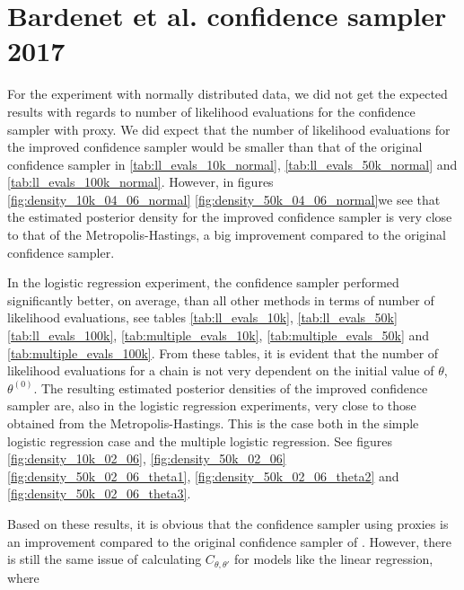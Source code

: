 \section{Bardenet et al. confidence sampler 2017}
For the experiment with normally distributed data, we did not get the expected results with regards to number of likelihood evaluations for the confidence sampler with proxy. We did expect that the number of likelihood evaluations for the improved confidence sampler would be smaller than that of the original confidence sampler in \ref{tab:ll_evals_10k_normal}, \ref{tab:ll_evals_50k_normal} and \ref{tab:ll_evals_100k_normal}. However, in figures \ref{fig:density_10k_04_06_normal} \ref{fig:density_50k_04_06_normal}we see that the estimated posterior density for the improved confidence sampler is very close to that of the Metropolis-Hastings, a big improvement compared to the original confidence sampler. 

In the logistic regression experiment, the confidence sampler performed significantly better, on average, than all other methods in terms of number of likelihood evaluations, see tables \ref{tab:ll_evals_10k}, \ref{tab:ll_evals_50k} \ref{tab:ll_evals_100k}, \ref{tab:multiple_evals_10k}, \ref{tab:multiple_evals_50k} and \ref{tab:multiple_evals_100k}. From these tables, it is evident that the number of likelihood evaluations for a chain is not very dependent on the initial value of $\theta$, $\theta^{\left(0\right)}$.  The resulting estimated posterior densities of the improved confidence sampler are, also in the logistic regression experiments, very close to those obtained from the Metropolis-Hastings. This is the case both in the simple logistic regression case and the multiple logistic regression. See figures \ref{fig:density_10k_02_06}, \ref{fig:density_50k_02_06} \ref{fig:density_50k_02_06_theta1}, \ref{fig:density_50k_02_06_theta2} and \ref{fig:density_50k_02_06_theta3}.  

Based on these results, it is obvious that the confidence sampler using proxies is an improvement compared to the original confidence sampler of \cite{Bardenet:2}. However, there is still the same issue of calculating $C_{\theta, \theta'}$ for models like the linear regression, where 
